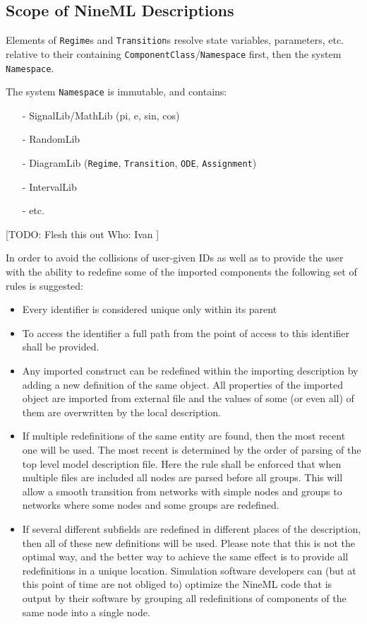 \documentclass{article}
\begin{document}
\subsection{Scope of NineML Descriptions}
\label{scope}

Elements of {\tt Regime}s and {\tt Transition}s resolve state
variables, parameters, etc. relative to their containing
{\tt ComponentClass}/{\tt Namespace} first, then the system {\tt Namespace}.

The system {\tt Namespace} is immutable, and contains:
\begin{itemize}
\item[-]{SignalLib/MathLib (pi, e, sin, cos)}
\item[-]{RandomLib}
\item[-]{DiagramLib ({\tt Regime}, {\tt Transition}, {\tt ODE},
{\tt Assignment})}
\item[-]{IntervalLib}
\item[-]{etc.}
\end{itemize}

[TODO:
Flesh this out
Who: Ivan
]

In order to avoid the collisions of user-given IDs as well as to
provide the user with the ability to redefine some of the imported
components the following set of rules is suggested:
\begin{itemize}
\item{Every identifier is considered unique only within its parent}
\item{To access the identifier a full path from the point of access
to this identifier shall be provided.}
\item{Any imported construct can be redefined within the importing
description by adding a new definition of the same object. All properties
of the imported object are imported from external file and the values of
some (or even all) of them are overwritten by the local description.}
\item{If multiple redefinitions of the same entity are found, then the most
recent one will be used. The most recent is determined by the order of
parsing of the top level model description file. Here the rule shall be
enforced that when multiple files are included all nodes are parsed before
all groups. This will allow a smooth transition from networks with simple
nodes and groups to networks where some nodes and some groups are redefined.}
\item{If several different subfields are redefined in different places of the
description, then all of these new definitions will be used. Please note that
this is not the optimal way, and the better way to achieve the same effect is
to provide all redefinitions in a unique location. Simulation software
developers can (but at this point of time are not obliged to) optimize the
NineML code that is output by their software by grouping all redefinitions
of components of the same node into a single node.}
\end{itemize}
\end{document}
